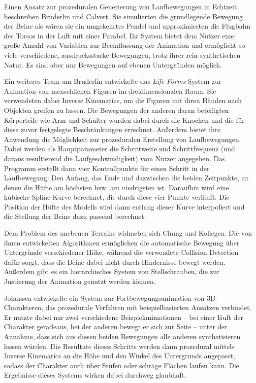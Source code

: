Einen Ansatz zur prozeduralen Generierung von Laufbewegungen in Echtzeit beschreiben Bruderlin und Calvert\cite{bruderlin1993interactive}\cite{bruderlin1996knowledge}. Sie simulierten die grundlegende Bewegung der Beine als wären sie ein umgekehrtes Pendel und approximierten die Flugbahn des Torsos in der Luft mit einer Parabel. Ihr System bietet dem Nutzer eine große Anzahl von Variablen zur Beeinflussung der Animation und ermöglicht so viele verschiedene, ausdrucksstarke Bewegungen, trotz ihrer rein synthetischen Natur. Es sind aber nur Bewegungen auf ebenen Untergründen möglich.

Ein weiteres Team um Bruderlin\cite{bruderlin1994procedural} entwickelte das \textit{Life Forms} System zur Animation von menschlichen Figuren im dreidimensionalen Raum. Sie verwendeten dabei Inverse Kinematics, um die Figuren mit ihren Händen nach Objekten greifen zu lassen. Die Bewegungen der anderen daran beteiligten Körperteile wie Arm und Schulter wurden dabei durch die Knochen und die für diese zuvor festgelegte Beschränkungen errechnet. Außerdem bietet ihre Anwendung die Möglichkeit zur prozeduralen Erstellung von Laufbewegungen. Dabei werden als Hauptparameter die Schrittweite und Schrittfrequenz (und daraus resultierend die Laufgeschwindigkeit) vom Nutzer angegeben. Das Programm erstellt dann vier Kontrollpunkte für einen Schritt in der Laufbewegung: Den Anfang, das Ende und dazwischen die beiden Zeitpunkte, an denen die Hüfte am höchsten bzw. am niedrigsten ist. Daraufhin wird eine kubische Spline-Kurve berechnet, die durch diese vier Punkte verläuft. Die Position der Hüfte des Modells wird dann entlang dieser Kurve interpoliert und die Stellung der Beine dazu passend berechnet.

Dem Problem des unebenen Terrains widmeten sich Chung und Kollegen\cite{chung1999animation}. Die von ihnen entwickelten Algorithmen ermöglichen die automatische Bewegung über Untergründe verschiedener Höhe, während die verwendete Collision Detection dafür sorgt, dass die Beine dabei nicht durch Hindernisse bewegt werden. Außerdem gibt es ein hierarchisches System von Stellschrauben, die zur Justierung der Animation genutzt werden können.

Johansen\cite{johansen2009automated} entwickelte ein System zur Fortbewegungsanimation von 3D-Charakteren, das prozedurale Verfahren mit beispielbasierten Ansätzen verbindet. Er nutzte dabei nur zwei verschiedene Beispielanimationen -- bei einer läuft der Charakter geradeaus, bei der anderen bewegt er sich zur Seite -- unter der Annahme, dass sich aus diesen beiden Bewegungen alle anderen synthetisieren lassen würden. Die Resultate dieses Schritts werden dann prozedural mittels Inverse Kinematics an die Höhe und den Winkel des Untergrunds angepasst, sodass der Charakter auch über Stufen oder schräge Flächen laufen kann. Die Ergebnisse dieses Systems wirken dabei durchweg glaubhaft.

